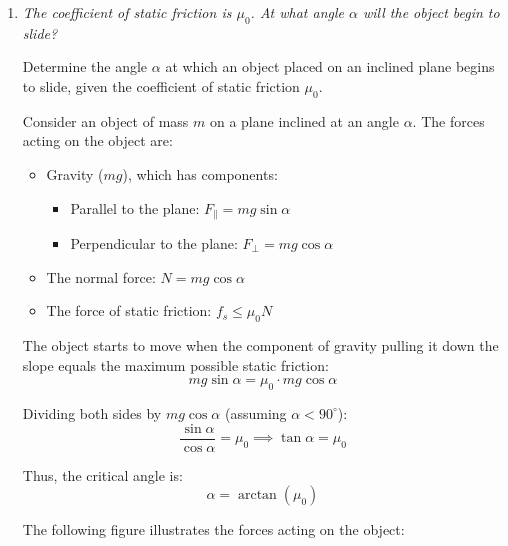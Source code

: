 \documentclass[a4paper,12pt]{letter}
\begin{document}
\begin{enumerate}

\item \textit{The coefficient of static friction is $\mu_{0}$. At what angle $\alpha$ will the object begin to slide?}

\medskip

Determine the angle $\alpha$ at which an object placed on an inclined plane begins to slide, given the coefficient of static friction $\mu_0$.

Consider an object of mass $m$ on a plane inclined at an angle $\alpha$. The forces acting on the object are:
\begin{itemize}
    \item Gravity ($mg$), which has components:
    \begin{itemize}
        \item Parallel to the plane: $F_{\parallel} = mg \sin\alpha$
        \item Perpendicular to the plane: $F_{\perp} = mg \cos\alpha$
    \end{itemize}
    \item The normal force: $N = mg \cos\alpha$
    \item The force of static friction: $f_s \leq \mu_0 N$
\end{itemize}

The object starts to move when the component of gravity pulling it down the slope equals the maximum possible static friction:
\begin{equation}
    mg \sin\alpha = \mu_0 \cdot mg \cos\alpha
\end{equation}

Dividing both sides by $mg \cos\alpha$ (assuming $\alpha < 90^\circ$):
\begin{equation}
    \frac{\sin\alpha}{\cos\alpha} = \mu_0 \implies \tan\alpha = \mu_0
\end{equation}

Thus, the critical angle is:
\begin{equation}
    \alpha = \arctan(\mu_0)
\end{equation}

The following figure illustrates the forces acting on the object:

\begin{center}
\end{center}
\end{enumerate}
\end{document}
